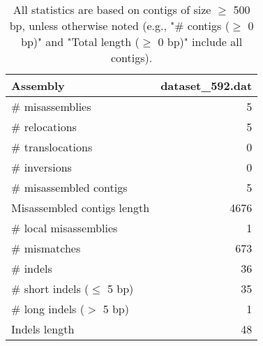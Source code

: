 \documentclass[12pt,a4paper]{article}
\begin{document}
\begin{table}[ht]
\begin{center}
\caption{All statistics are based on contigs of size $\geq$ 500 bp, unless otherwise noted (e.g., "\# contigs ($\geq$ 0 bp)" and "Total length ($\geq$ 0 bp)" include all contigs).}
\begin{tabular}{|l*{1}{|r}|}
\hline
Assembly & dataset\_592.dat \\ \hline
\# misassemblies & 5 \\ \hline
\hspace{5mm}\# relocations & 5 \\ \hline
\hspace{5mm}\# translocations & 0 \\ \hline
\hspace{5mm}\# inversions & 0 \\ \hline
\# misassembled contigs & 5 \\ \hline
Misassembled contigs length & 4676 \\ \hline
\# local misassemblies & 1 \\ \hline
\# mismatches & 673 \\ \hline
\# indels & 36 \\ \hline
\hspace{5mm}\# short indels ($\leq$ 5 bp) & 35 \\ \hline
\hspace{5mm}\# long indels ($>$ 5 bp) & 1 \\ \hline
Indels length & 48 \\ \hline
\end{tabular}
\end{center}
\end{table}
\end{document}
